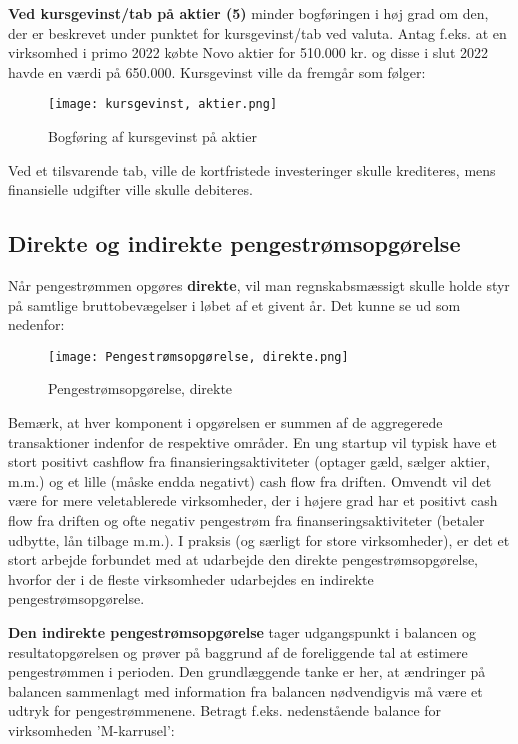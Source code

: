 \documentclass[10pt,reqno, usenames]{article}
\begin{document}
\textbf{Ved kursgevinst/tab på aktier (5)} minder bogføringen i høj grad om den, der er beskrevet under punktet for kursgevinst/tab ved valuta. Antag f.eks. at en virksomhed i primo 2022 købte Novo aktier for 510.000 kr. og disse i slut 2022 havde en værdi på 650.000. Kursgevinst ville da fremgår som følger: 

\begin{figure}[h]
     \centering
     \texttt{[image: kursgevinst, aktier.png]}
     \caption{Bogføring af kursgevinst på aktier}
     \label{Figur 1}
\end{figure} 

Ved et tilsvarende tab, ville de kortfristede investeringer skulle krediteres, mens finansielle udgifter ville skulle debiteres. 

\subsection{Direkte og indirekte pengestrømsopgørelse}
Når pengestrømmen opgøres \textbf{direkte}, vil man regnskabsmæssigt skulle holde styr på samtlige bruttobevægelser i løbet af et givent år. Det kunne se ud som nedenfor: 

\begin{figure}[h]
     \centering
     \texttt{[image: Pengestrømsopgørelse, direkte.png]}
     \caption{Pengestrømsopgørelse, direkte}
     \label{Figur 1}
\end{figure}

Bemærk, at hver komponent i opgørelsen er summen af de aggregerede transaktioner indenfor de respektive områder. En ung startup vil typisk have et stort positivt cashflow fra finansieringsaktiviteter (optager gæld, sælger aktier, m.m.) og et lille (måske endda negativt) cash flow fra driften. Omvendt vil det være for mere veletablerede virksomheder, der i højere grad har et positivt cash flow fra driften og ofte negativ pengestrøm fra finanseringsaktiviteter (betaler udbytte, lån tilbage m.m.). I praksis (og særligt for store virksomheder), er det et stort arbejde forbundet med at udarbejde den direkte pengestrømsopgørelse, hvorfor der i de fleste virksomheder udarbejdes en indirekte pengestrømsopgørelse. 

\vspace{10 pt}

\textbf{Den indirekte pengestrømsopgørelse} tager udgangspunkt i balancen og resultatopgørelsen og prøver på baggrund af de foreliggende tal at estimere pengestrømmen i perioden. Den grundlæggende tanke er her, at ændringer på balancen sammenlagt med information fra balancen nødvendigvis må være et udtryk for pengestrømmenene. Betragt f.eks. nedenstående balance for virksomheden 'M-karrusel':
\end{document}
